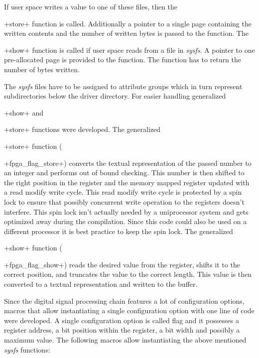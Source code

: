 \documentclass[12pt,a4paper,parskip=full,abstract=true,BCOR=12mm,twoside,open=right]{scrreprt}
\newcommand*{\SavedLstInline}{}
\DeclareRobustCommand*{\lstinline}{%
  \ifmmode
    \let\SavedBGroup\bgroup
    \def\bgroup{%
      \let\bgroup\SavedBGroup
      \hbox\bgroup
    }%
  \fi
  \SavedLstInline
}
\newcommand*{\lstitem}[1]{
  \setbox0\hbox{\lstinline{#1}}
  \item[\usebox0]
  \hfill \\
}
\def\device#1{\mbox{\textit{#1}}}
\begin{document}
If user space writes a value to one of these files, then the \lstinline+store+
function is called. Additionally a pointer to a single page containing the written
contents and the number of written bytes is passed to the function. The
\lstinline+show+ function is called if user space reads from a file in \device{sysfs}.
A pointer to one pre-allocated page is provided to the function. The function
has to return the number of bytes written.

The \device{sysfs} files have to be assigned to attribute groups which in turn represent
subdirectories below the driver directory\cite{sysfs}. For easier handling
generalized \lstinline+show+ and \lstinline+store+ functions were developed. The generalized
\lstinline+store+ function (\lstinline+fpga_flag_store+) converts the textual representation
of the passed number to an integer and performs out of bound checking. This number is then
shifted to the right position in the register and the memory mapped register updated with
a read modify write cycle. This read modify write cycle is protected by a spin lock to
ensure that possibly concurrent write operation to the registers doesn't interfere. This
spin lock isn't actually needed by a uniprocessor system and gets optimized away during
the compilation. Since this code could also be used on a different processor it is best
practice to keep the spin lock. The generalized \lstinline+show+ function
(\lstinline+fpga_flag_show+) reads the desired value from the register, shifts it to the
correct position, and truncates the value to the correct length. This value is then
converted to a textual representation and written to the buffer.

Since the digital signal processing chain features a lot of configuration options,
macros that allow instantiating a single configuration option with one line of code
were developed. A single configuration option is called flag and it possesses a
register address, a bit position within the register, a bit width and possibly a
maximum value. The following macros allow instantiating the above mentioned
\device{sysfs} functions:
\end{document}
